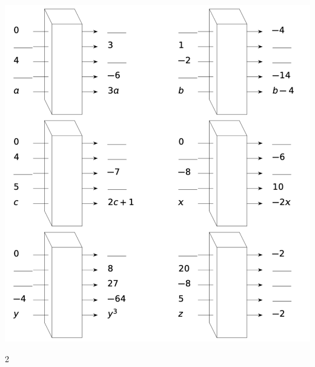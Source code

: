 \documentclass[a4paper,11pt]{report}
\begin{document}
{\begin{center}
\includegraphics[width=1\textwidth]{media/FA-30/bn10.pdf}
\end{center}
}
{2}

\newpage
\end{document}
